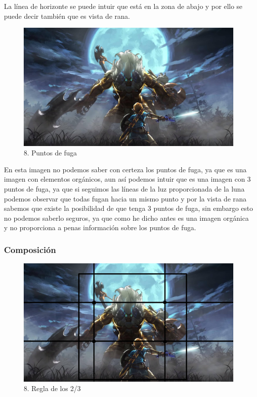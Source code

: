 \documentclass[12pt]{article}
\begin{document}
La línea de horizonte se puede intuir que está en la zona de abajo y por ello se puede decir también que es vista de rana.

\begin{figure}[H]
      \centering
      \includegraphics[scale=0.25]{images/Concepts/8_concept_art}
      \caption{\small 8. Puntos de fuga}
    \end{figure}
    
En esta imagen no podemos saber con certeza los puntos de fuga, ya que es una imagen con elementos orgánicos, aun así podemos intuir que es una imagen con 3 puntos de fuga, ya que si seguimos las líneas de la luz proporcionada de la luna podemos observar que todas fugan hacia un mismo punto y por la vista de rana sabemos que existe la posibilidad de que tenga 3 puntos de fuga, sin embargo esto no podemos saberlo seguros, ya que como he dicho antes es una imagen orgánica y no proporciona a penas información sobre los puntos de fuga.

        \subsubsection{Composición}

\begin{figure}[H]
      \centering
      \includegraphics[scale=0.25]{images/Raúl/Sección 8/Imagen 8 2 3.jpg}
      \caption{\small 8. Regla de los 2/3}
    \end{figure}
\end{document}
